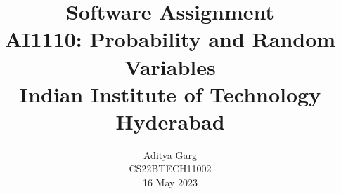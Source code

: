 \documentclass[journal,12pt,twocolumn]{IEEEtran}
\providecommand{\pr}[1]{\ensuremath{\Pr\left(#1\right)}}
\providecommand{\cbrak}[1]{\ensuremath{\left\{#1\right\}}}
\begin{document}
\newtheorem{theorem}{Theorem}[section]
\newtheorem{problem}{Problem}
\newtheorem{proposition}{Proposition}[section]
\newtheorem{lemma}{Lemma}[section]
\newtheorem{corollary}[theorem]{Corollary}
\newtheorem{example}{Example}[section]
\newtheorem{definition}[problem]{Definition}
\newcommand{\BEQA}{\begin{eqnarray}}
\newcommand{\EEQA}{\end{eqnarray}}
\newcommand{\define}{\stackrel{\triangle}{=}}



\providecommand{\mbf}{\mathbf}
\providecommand{\pr}[1]{\ensuremath{\Pr\left(#1\right)}}
\providecommand{\qfunc}[1]{\ensuremath{Q\left(#1\right)}}
\providecommand{\sbrak}[1]{\ensuremath{{}\left[#1\right]}}
\providecommand{\lsbrak}[1]{\ensuremath{{}\left[#1\right.}}
\providecommand{\rsbrak}[1]{\ensuremath{{}\left.#1\right]}}
\providecommand{\brak}[1]{\ensuremath{\left(#1\right)}}
\providecommand{\lbrak}[1]{\ensuremath{\left(#1\right.}}
\providecommand{\rbrak}[1]{\ensuremath{\left.#1\right)}}
\providecommand{\cbrak}[1]{\ensuremath{\left\{#1\right\}}}
\providecommand{\lcbrak}[1]{\ensuremath{\left\{#1\right.}}
\providecommand{\rcbrak}[1]{\ensuremath{\left.#1\right\}}}
\theoremstyle{remark}
\newtheorem{rem}{Remark}
\newcommand{\sgn}{\mathop{\mathrm{sgn}}}

\newcommand{\solution}{\noindent \textbf{Solution: }}
\newcommand{\cosec}{\,\text{cosec}\,}
\providecommand{\dec}[2]{\ensuremath{\overset{#1}{\underset{#2}{\gtrless}}}}
\newcommand{\myvec}[1]{\ensuremath{\begin{pmatrix}#1\end{pmatrix}}}
\newcommand{\mydet}[1]{\ensuremath{\begin{vmatrix}#1\end{vmatrix}}}
\newcommand{\xor}{\oplus}
\let\vec\mathbf


\vspace{3cm}

\title{
   Software Assignment \\ \Large AI1110: Probability and Random Variables \\ \large Indian Institute of Technology Hyderabad
}
\author{ Aditya Garg \\ CS22BTECH11002 \\ 16 May 2023	
	
}	
\maketitle
\newpage
\bigskip
\end{document}
